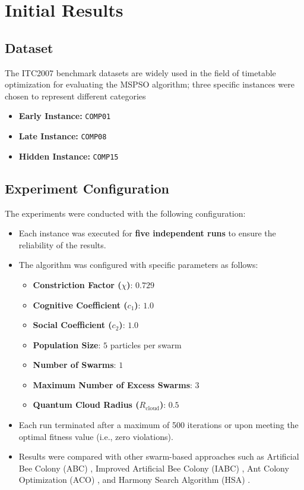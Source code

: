 \section{Initial Results}
\label{sec:initial_results}

\subsection{Dataset}

The ITC2007 benchmark datasets are widely used in the field of timetable optimization for evaluating the MSPSO algorithm; three specific instances were chosen to represent different categories

\begin{itemize}
    \item \textbf{Early Instance:} \texttt{COMP01}
    \item \textbf{Late Instance:} \texttt{COMP08}
    \item \textbf{Hidden Instance:} \texttt{COMP15}
\end{itemize}

\subsection{Experiment Configuration}

The experiments were conducted with the following configuration:

\begin{itemize}
    \item Each instance was executed for \textbf{five independent runs} to ensure the reliability of the results.
    \item The algorithm was configured with specific parameters as follows:
        \begin{itemize}
            \item \textbf{Constriction Factor (\(\chi\))}: \(0.729\)
            \item \textbf{Cognitive Coefficient (\(c_1\))}: \(1.0\)
            \item \textbf{Social Coefficient (\(c_2\))}: \(1.0\)
            \item \textbf{Population Size}: \(5\) particles per swarm
            \item \textbf{Number of Swarms}: \(1\)
            \item \textbf{Maximum Number of Excess Swarms}: \(3\)
            \item \textbf{Quantum Cloud Radius (\(R_{\text{cloud}}\))}: \(0.5\)
        \end{itemize}
    \item Each run terminated after a maximum of 500 iterations or upon meeting the optimal fitness value (i.e., zero violations).
    \item Results were compared with other swarm-based approaches such as Artificial Bee Colony (ABC) \cite{bolaji2011abc}, Improved Artificial Bee Colony (IABC) \cite{Bolaji2011-abc}, Ant Colony Optimization (ACO) \cite{kenekayoro2016aco}, and Harmony Search Algorithm (HSA) \cite{beyrouthy2014hsa}.

\end{itemize}

